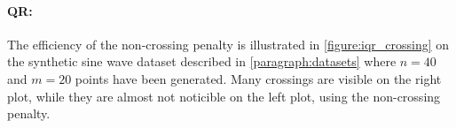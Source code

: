 \paragraph{\ac{QR}:}
The efficiency of the non-crossing penalty is illustrated in
\cref{figure:iqr_crossing} on the synthetic sine wave dataset described in
\cref{paragraph:datasets} where $n=40$ and $m=20$ points have been generated.
Many crossings are visible on the right plot, while they are almost not
noticible on the left plot, using the non-crossing penalty.
